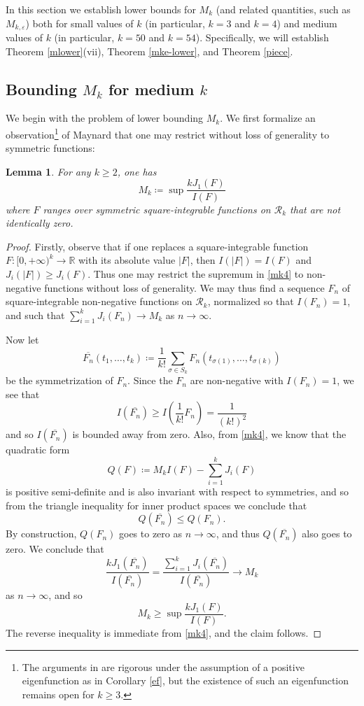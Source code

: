 \documentclass{bmcart}
\theoremstyle{plain}
\newtheorem{lemma}[theorem]{Lemma}
\theoremstyle{definition}
\newcommand\R{\mathbb{R}}
\newcommand\eps{\varepsilon}
\begin{document}
In this section we establish lower bounds for $M_k$ (and related quantities, such as $M_{k,\eps}$) both for small values of $k$ (in particular, $k=3$ and $k=4$) and medium values of $k$ (in particular, $k=50$ and $k=54$).  Specifically, we will establish Theorem \ref{mlower}(vii), Theorem \ref{mke-lower}, and Theorem \ref{piece}.

\subsection{Bounding \texorpdfstring{$M_k$}{Mk} for medium \texorpdfstring{$k$}{k}}

We begin with the problem of lower bounding $M_k$.  We first formalize an observation\footnote{The arguments in \cite{maynard-new} are rigorous under the assumption of a positive eigenfunction as in Corollary \ref{ef}, but the existence of such an eigenfunction remains open for $k \geq 3$.} of Maynard \cite{maynard-new} that one may restrict without loss of generality to symmetric functions:

\begin{lemma}  For any $k \geq 2$, one has
$$ M_k \coloneqq \sup \frac{k J_1(F)}{I(F)}$$
where $F$ ranges over \emph{symmetric} square-integrable functions on ${\mathcal R}_k$ that are not identically zero.
\end{lemma}

\begin{proof}  Firstly, observe that if one replaces a square-integrable function $F: [0,+\infty)^k \to \R$ with its absolute value $|F|$, then $I(|F|) = I(F)$ and $J_i(|F|) \geq J_i(F)$.  Thus one may restrict the supremum in \eqref{mk4} to non-negative functions without loss of generality.  We may thus find a sequence $F_n$ of square-integrable non-negative functions on ${\mathcal R}_k$, normalized so that $I(F_n)=1$, and such that $\sum_{i=1}^k J_i(F_n) \to M_k$ as $n \to \infty$.

Now let
$$\overline{F_n}(t_1,\dots,t_k) \coloneqq \frac{1}{k!} \sum_{\sigma \in S_k} F_n( t_{\sigma(1)},\dots,t_{\sigma(k)} )$$
be the symmetrization of $F_n$.  Since the $F_n$ are non-negative with $I(F_n)=1$, we see that
$$ I( \overline{F_n} ) \geq I( \frac{1}{k!} F_n ) = \frac{1}{(k!)^2}$$
and so $I(\overline{F_n})$ is bounded away from zero.  Also, from \eqref{mk4}, we know that the quadratic form
$$ Q(F) \coloneqq M_k I(F) - \sum_{i=1}^k J_i(F)$$
is positive semi-definite and is also invariant with respect to symmetries, and so from the triangle inequality for inner product spaces we conclude that
$$ Q( \overline{F_n} ) \leq Q( F_n ).$$
By construction, $Q(F_n)$ goes to zero as $n \to \infty$, and thus $Q(\overline{F_n})$ also goes to zero.  We conclude that
$$ \frac{k J_1(\overline{F_n})}{I(\overline{F_n})} = \frac{\sum_{i=1}^k J_i(\overline{F_n})}{I(\overline{F_n})} \to M_k$$
as $n \to \infty$, and so
$$ M_k \geq \sup \frac{k J_1(F)}{I(F)}.$$
The reverse inequality is immediate from \eqref{mk4}, and the claim follows.
\end{proof}
\end{document}
